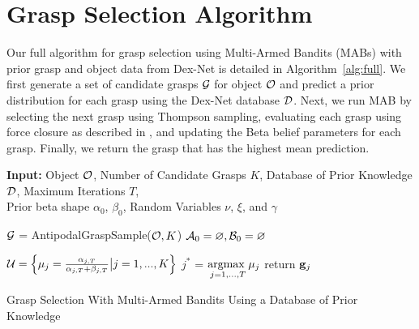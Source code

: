 \section{Grasp Selection Algorithm}

Our full algorithm for grasp selection using Multi-Armed Bandits (MABs) with prior grasp and object data from Dex-Net is detailed in Algorithm~\ref{alg:full}.
We first generate a set of candidate grasps $\mathcal{G}$ for object $\mathcal{O}$ and predict a prior distribution for each grasp using the Dex-Net database $\mathcal{D}$.
Next, we run MAB by selecting the next grasp using Thompson sampling, evaluating each grasp using force closure as described in , and updating the Beta belief parameters for each grasp.
Finally, we return the grasp that has the highest mean prediction.

\begin{algorithm}
{\small
    \SetAlgoLined
    {\bf Input:} Object $\mathcal{O}$, Number of Candidate Grasps $K$, Database of Prior Knowledge $\mathcal{D}$, Maximum Iterations $T$, \\ Prior beta shape $\alpha_0$, $\beta_0$, Random Variables $\nu$, $\xi$, and $\gamma$ \\
    
	$\mathcal{G}$ = AntipodalGraspSample($\mathcal{O}, K$) \;
	$\mathcal{A}_0 = \varnothing, \mathcal{B}_0 = \varnothing$\;
	
	
	$\mathcal{U} = \left\{ \mu_j = \frac{\alpha_{j,T}}{\alpha_{j,T} + \beta_{j,T}} \big| j = 1, ..., K \right\}$\;
	$j^*$ = $\underset{j = 1, ..., T}{\text{argmax }} \mu_j$\;
	return $\mathbf{g}_j$\;
    \caption{Grasp Selection With Multi-Armed Bandits Using a Database of Prior Knowledge}
    \label{alg:full}
}
\end{algorithm}

